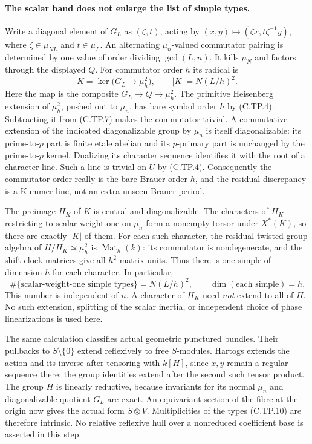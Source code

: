 \paragraph{The scalar band does not enlarge the list of simple types.}
Write a diagonal element of $G_L$ as $(\zeta,t)$, acting by
$(x,y)\mapsto(\zeta x,t\zeta^{-1}y)$, where
$\zeta\in\mu_{NL}$ and $t\in\mu_L$.  An alternating
$\mu_n$-valued commutator pairing is determined by one value of
order dividing $\gcd(L,n)$.  It kills $\mu_N$ and factors through
the displayed $Q$.  For commutator order $h$ its radical is
\[
 K=\ker\bigl(G_L\longrightarrow\mu_h^2\bigr),
 \qquad |K|=N(L/h)^2.                                  \tag{C.TP.9}
\]
Here the map is the composite $G_L\to Q\to\mu_h^2$.
The primitive Heisenberg extension of $\mu_h^2$, pushed out to
$\mu_n$, has bare symbol order $h$ by (C.TP.4).  Subtracting it
from (C.TP.7) makes the commutator trivial.  A commutative extension
of the indicated diagonalizable group by $\mu_n$ is itself
diagonalizable: its prime-to-$p$ part is finite etale abelian and
its $p$-primary part is unchanged by the prime-to-$p$ kernel.
Dualizing its character sequence identifies it with the root of
a character line.  Such a line is trivial on $U$ by (C.TP.4).
Consequently the commutator order really is the bare Brauer order
$h$, and the residual discrepancy is a Kummer line, not an extra
unseen Brauer period.

The preimage $H_K$ of $K$ is central and diagonalizable.  The
characters of $H_K$ restricting to scalar weight one on $\mu_n$
form a nonempty torsor under $X^*(K)$, so there are exactly $|K|$
of them.  For each such character, the residual twisted group
algebra of $H/H_K\simeq\mu_h^2$ is $\operatorname{Mat}_h(k)$:
its commutator is nondegenerate, and the shift-clock matrices give
all $h^2$ matrix units.  Thus there is one simple of dimension $h$
for each character.  In particular,
\[
 \#\{\text{scalar-weight-one simple types}\}=N(L/h)^2,
 \qquad \dim(\text{each simple})=h.                    \tag{C.TP.10}
\]
This number is independent of $n$.  A character of $H_K$ need
\emph{not} extend to all of $H$.  No such extension, splitting of
the scalar inertia, or independent choice of phase linearizations
is used here.

The same calculation classifies actual geometric punctured bundles.
Their pullbacks to $S\setminus\{0\}$ extend reflexively to free
$S$-modules.  Hartogs extends the action and its inverse after
tensoring with $k[H]$, since $x,y$ remain a regular sequence there;
the group identities extend after the second such tensor product.
The group $H$ is linearly reductive, because invariants for its
normal $\mu_n$ and diagonalizable quotient $G_L$ are exact.
An equivariant section of the fibre at the origin now gives the
actual form $S\otimes V$.  Multiplicities of the types (C.TP.10)
are therefore intrinsic.  No relative reflexive hull over a
nonreduced coefficient base is asserted in this step.


